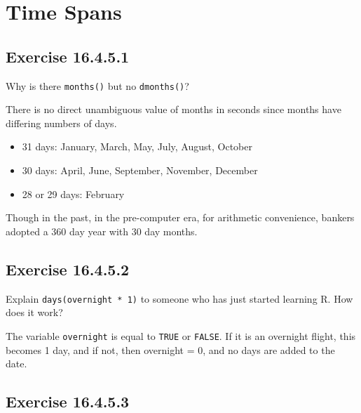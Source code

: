 \documentclass[]{book}
\providecommand{\tightlist}{%
  \setlength{\itemsep}{0pt}\setlength{\parskip}{0pt}}
\theoremstyle{plain}
\theoremstyle{remark}
\begin{document}
\hypertarget{time-spans}{%
\section{Time Spans}\label{time-spans}}

\hypertarget{exercise-16.4.5.1}{%
\subsection*{\texorpdfstring{Exercise
{16.4.5.1}}{Exercise 16.4.5.1}}\label{exercise-16.4.5.1}}

Why is there \texttt{months()} but no \texttt{dmonths()}?

There is no direct unambiguous value of months in seconds since months
have differing numbers of days.

\begin{itemize}
\tightlist
\item
  31 days: January, March, May, July, August, October
\item
  30 days: April, June, September, November, December
\item
  28 or 29 days: February
\end{itemize}

Though in the past, in the pre-computer era, for arithmetic convenience,
bankers adopted a 360 day year with 30 day months.

\hypertarget{exercise-16.4.5.2}{%
\subsection*{\texorpdfstring{Exercise
{16.4.5.2}}{Exercise 16.4.5.2}}\label{exercise-16.4.5.2}}

Explain \texttt{days(overnight\ *\ 1)} to someone who has just started
learning R. How does it work?

The variable \texttt{overnight} is equal to \texttt{TRUE} or
\texttt{FALSE}. If it is an overnight flight, this becomes 1 day, and if
not, then overnight = 0, and no days are added to the date.

\hypertarget{exercise-16.4.5.3}{%
\subsection*{\texorpdfstring{Exercise
{16.4.5.3}}{Exercise 16.4.5.3}}\label{exercise-16.4.5.3}}
\end{document}
